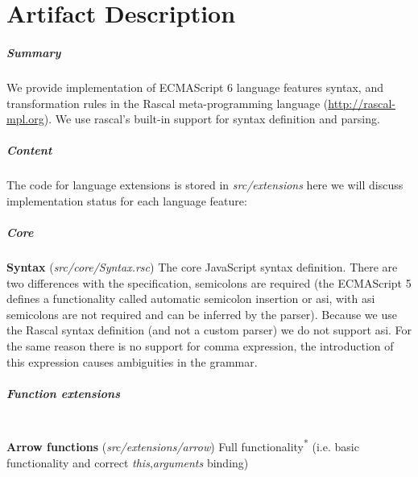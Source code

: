 
\chapter{Artifact Description} %

\label{AppendixA} %


\paragraph{Summary}
We provide implementation of ECMAScript 6 language features syntax, and transformation rules in the Rascal meta-programming language (\url{http://rascal-mpl.org}). We use rascal's built-in support for syntax definition and parsing.

\paragraph{Content}
The code for language extensions is stored in \textit{src/extensions} here we will discuss implementation status for each language feature:

\paragraph{Core}
\textbf{Syntax} (\textit{src/core/Syntax.rsc}) \newline
The core JavaScript syntax definition. There are two differences with the specification, semicolons are required (the ECMAScript 5 defines a functionality called automatic semicolon insertion or asi, with asi semicolons are not required and can be inferred by the parser). Because we use the Rascal syntax definition (and not a custom parser) we do not support asi. For the same reason there is no support for comma expression, the introduction of this expression causes ambiguities in the grammar.

\paragraph{Function extensions}\mbox{}\\
\textbf{Arrow functions} (\textit{src/extensions/arrow}) \newline
Full functionality\textsuperscript{*} (i.e. basic functionality and correct \textit{this},\textit{arguments} binding)

